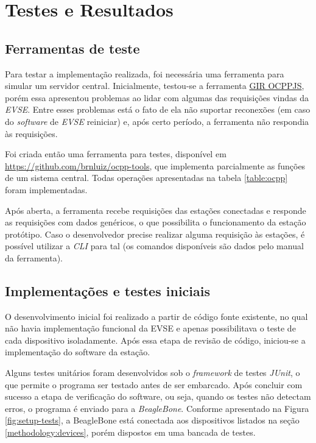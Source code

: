 \chapter{Testes e Resultados}
\label{tests:tests}

  \section{Ferramentas de teste}
  \label{tests:tools}

    Para testar a implementação realizada, foi necessária uma ferramenta para simular um servidor central. Inicialmente, testou-se a ferramenta \href{http://www.gir.fr/ocppjs/}{GIR OCPPJS}, porém essa apresentou problemas ao lidar com algumas das requisições vindas da \textit{\ac{EVSE}}. Entre esses problemas está o fato de ela não suportar reconexões (em caso do \textit{software} de \textit{\ac{EVSE}} reiniciar) e, após certo período, a ferramenta não respondia às requisições.

    Foi criada então uma ferramenta para testes, disponível em \url{https://github.com/brnluiz/ocpp-tools}, que implementa parcialmente as funções de um sistema central. Todas operações apresentadas na tabela \ref{table:ocpp} foram implementadas.

    Após aberta, a ferramenta recebe requisições das estações conectadas e responde as requisições com dados genéricos, o que possibilita o funcionamento da estação protótipo. Caso o desenvolvedor precise realizar alguma requisição às estações, é possível utilizar a \textit{\ac{CLI}} para tal (os comandos disponíveis são dados pelo manual da ferramenta).

  \section{Implementações e testes iniciais}
  \label{tests:initial}

    O desenvolvimento inicial foi realizado a partir de código fonte existente, no qual não havia implementação funcional da EVSE e apenas possibilitava o teste de cada dispositivo isoladamente. Após essa etapa de revisão de código, iniciou-se a implementação do software da estação.

    Alguns testes unitários foram desenvolvidos sob o \textit{framework} de testes \textit{JUnit}, o que permite o programa ser testado antes de ser embarcado. Após concluir com sucesso a etapa de verificação do software, ou seja, quando os testes não detectam erros, o programa é enviado para a \textit{BeagleBone}. Conforme apresentado na Figura \ref{fig:setup-tests}, a BeagleBone está conectada aos dispositivos listados na seção \ref{methodology:devices}, porém dispostos em uma bancada de testes.

